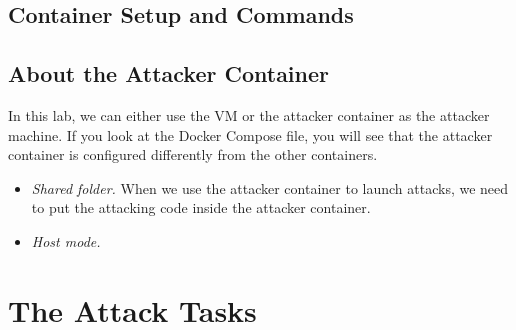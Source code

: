 \subsection{Container Setup and Commands}






\subsection{About the Attacker Container} 

In this lab, we can either use the VM or the attacker container 
as the attacker machine. If you look at the Docker Compose file, you will
see that the attacker container is configured differently from the other 
containers. 


\begin{itemize}
\item \textit{Shared folder.} When we use the attacker container 
to launch attacks, we need to put the attacking code inside
the attacker container. 



\item \textit{Host mode.} 

\end{itemize}








\section{The Attack Tasks}


